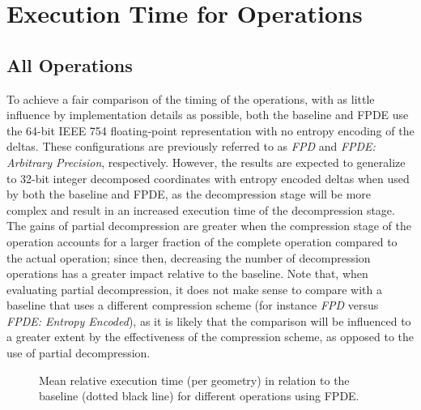





\section{Execution Time for Operations}
\subsection{All Operations}
\label{sec:exec_time}
To achieve a fair comparison of the timing of the operations, with as little influence by implementation details as possible, both the baseline and FPDE use the 64-bit IEEE 754 floating-point representation with no entropy encoding of the deltas. These configurations are previously referred to as \textit{FPD} and \textit{FPDE: Arbitrary Precision}, respectively. However, the results are expected to generalize to 32-bit integer decomposed coordinates with entropy encoded deltas when used by both the baseline and FPDE, as the decompression stage will be more complex and result in an increased execution time of the decompression stage. The gains of partial decompression are greater when the compression stage of the operation accounts for a larger fraction of the complete operation compared to the actual operation; since then, decreasing the number of decompression operations has a greater impact relative to the baseline. Note that, when evaluating partial decompression, it does not make sense to compare with a baseline that uses a different compression scheme (for instance \textit{FPD} versus \textit{FPDE: Entropy Encoded}), as it is likely that the comparison will be influenced to a greater extent by the effectiveness of the compression scheme, as opposed to the use of partial decompression.

\begin{figure}[htbp]
    \centering
    

    \caption{Mean relative execution time (per geometry) in relation to the baseline (dotted black line) for different operations using FPDE. }
    \label{fig:op_time}
\end{figure}

